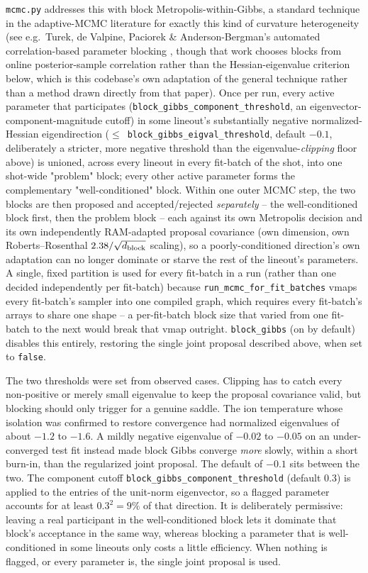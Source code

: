 \documentclass[11pt]{article}
\newcommand{\code}[1]{\texttt{#1}}
\begin{document}
\code{mcmc.py} addresses this with block Metropolis-within-Gibbs, a standard technique in
the adaptive-MCMC literature for exactly this kind of curvature heterogeneity (see e.g.\
Turek, de Valpine, Paciorek \& Anderson-Bergman's automated correlation-based parameter
blocking \cite{turek2015}, though that work chooses blocks from online posterior-sample
correlation rather than the Hessian-eigenvalue criterion below, which is this codebase's
own adaptation of the general technique rather than a method drawn directly from that
paper). Once per run, every active parameter that participates
(\code{block\_gibbs\_component\_threshold}, an eigenvector-component-magnitude cutoff)
in some lineout's substantially negative normalized-Hessian eigendirection
($\le$~\code{block\_gibbs\_eigval\_threshold}, default $-0.1$, deliberately a stricter,
more negative threshold than the eigenvalue-\emph{clipping} floor above) is unioned,
across every lineout in every fit-batch of the shot, into
one shot-wide "problem" block; every other active parameter forms the complementary
"well-conditioned" block. Within one outer MCMC step, the two blocks are then proposed and
accepted/rejected \emph{separately} -- the well-conditioned block first, then the problem
block -- each against its own Metropolis decision and its own independently RAM-adapted
proposal covariance (own dimension, own Roberts--Rosenthal $2.38/\sqrt{d_{\rm block}}$
scaling), so a poorly-conditioned direction's own adaptation can no longer dominate or
starve the rest of the lineout's parameters. A single, fixed partition is used for every
fit-batch in a run (rather than one decided independently per fit-batch) because
\code{run\_mcmc\_for\_fit\_batches} vmaps every fit-batch's sampler into one compiled
graph, which requires every fit-batch's arrays to share one shape -- a per-fit-batch block
size that varied from one fit-batch to the next would break that vmap outright.
\code{block\_gibbs} (on by default) disables this entirely, restoring the single joint
proposal described above, when set to \code{false}.

The two thresholds were set from observed cases. Clipping has to catch every
non-positive or merely small eigenvalue to keep the proposal covariance valid, but
blocking should only trigger for a genuine saddle. The ion temperature whose isolation
was confirmed to restore convergence had normalized eigenvalues of about $-1.2$ to $-1.6$.
A mildly negative eigenvalue of $-0.02$ to $-0.05$ on an under-converged test fit instead
made block Gibbs converge \emph{more} slowly, within a short burn-in, than the regularized
joint proposal. The default of $-0.1$ sits between the two. The component cutoff
\code{block\_gibbs\_component\_threshold} (default $0.3$) is applied to the entries of the
unit-norm eigenvector, so a flagged parameter accounts for at least $0.3^2=9\%$ of that
direction. It is deliberately permissive: leaving a real participant in the
well-conditioned block lets it dominate that block's acceptance in the same way, whereas
blocking a parameter that is well-conditioned in some lineouts only costs a little
efficiency. When nothing is flagged, or every parameter is, the single joint proposal is
used.
\end{document}
